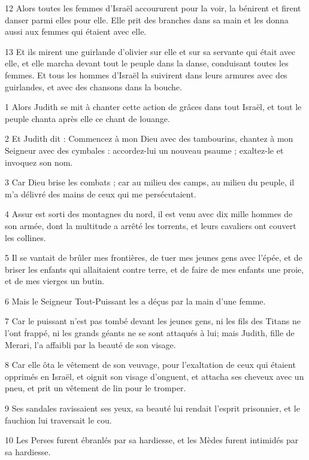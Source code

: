 \par 12 Alors toutes les femmes d'Israël accoururent pour la voir, la bénirent et firent danser parmi elles pour elle. Elle prit des branches dans sa main et les donna aussi aux femmes qui étaient avec elle.
\par 13 Et ils mirent une guirlande d'olivier sur elle et sur sa servante qui était avec elle, et elle marcha devant tout le peuple dans la danse, conduisant toutes les femmes. Et tous les hommes d'Israël la suivirent dans leurs armures avec des guirlandes, et avec des chansons dans la bouche.


\par 1 Alors Judith se mit à chanter cette action de grâces dans tout Israël, et tout le peuple chanta après elle ce chant de louange.
\par 2 Et Judith dit : Commencez à mon Dieu avec des tambourins, chantez à mon Seigneur avec des cymbales : accordez-lui un nouveau psaume ; exaltez-le et invoquez son nom.
\par 3 Car Dieu brise les combats ; car au milieu des camps, au milieu du peuple, il m'a délivré des mains de ceux qui me persécutaient.
\par 4 Assur est sorti des montagnes du nord, il est venu avec dix mille hommes de son armée, dont la multitude a arrêté les torrents, et leurs cavaliers ont couvert les collines.
\par 5 Il se vantait de brûler mes frontières, de tuer mes jeunes gens avec l'épée, et de briser les enfants qui allaitaient contre terre, et de faire de mes enfants une proie, et de mes vierges un butin.
\par 6 Mais le Seigneur Tout-Puissant les a déçus par la main d'une femme.
\par 7 Car le puissant n'est pas tombé devant les jeunes gens, ni les fils des Titans ne l'ont frappé, ni les grands géants ne se sont attaqués à lui; mais Judith, fille de Merari, l'a affaibli par la beauté de son visage.
\par 8 Car elle ôta le vêtement de son veuvage, pour l'exaltation de ceux qui étaient opprimés en Israël, et oignit son visage d'onguent, et attacha ses cheveux avec un pneu, et prit un vêtement de lin pour le tromper.
\par 9 Ses sandales ravissaient ses yeux, sa beauté lui rendait l'esprit prisonnier, et le fauchion lui traversait le cou.
\par 10 Les Perses furent ébranlés par sa hardiesse, et les Mèdes furent intimidés par sa hardiesse.
